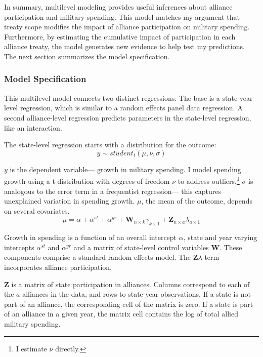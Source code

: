 \documentclass[12pt]{article}
\begin{document}
In summary, multilevel modeling provides useful inferences about alliance participation and military spending. 
This model matches my argument that treaty scope modifies the impact of alliance participation on military spending. 
Furthermore, by estimating the cumulative impact of participation in each alliance treaty, the model generates new evidence to help test my predictions. 
The next section summarizes the model specification. 
 


\subsubsection{Model Specification} 

This multilevel model connects two distinct regressions. 
The base is a state-year-level regression, which is similar to a random effects panel data regression.
A second alliance-level regression predicts parameters in the state-level regression, like an interaction. 


The state-level regression starts with a distribution for the outcome:
\begin{equation}
y \sim student_t(\mu, \nu, \sigma)
\end{equation}
 

$y$ is the dependent variable--- growth in military spending. 
I model spending growth using a t-distribution with degrees of freedom $\nu$ to address outliers.\footnote{I estimate $\nu$ directly.}
$\sigma$ is analogous to the error term in a frequentist regression--- this captures unexplained variation in spending growth.  
$\mu$, the mean of the outcome, depends on several covariates.
\begin{equation}
\mu = \alpha + \alpha^{st} + \alpha^{yr} +\textbf{W}_{n \times k} \gamma_{k \times 1}  + \textbf{Z}_{n \times a} \lambda_{a \times 1} 
\end{equation}


Growth in spending is a function of an overall intercept $\alpha$, state and year varying intercepts $\alpha^{st}$ and $\alpha^{yr}$ and a matrix of state-level control variables $\textbf{W}$.
These components comprise a standard random effects model. 
The $\textbf{Z} \lambda$ term incorporates alliance participation.


$\textbf{Z}$ is a matrix of state participation in alliances. 
Columns correspond to each of the $a$ alliances in the data, and rows to state-year observations. 
If a state is not part of an alliance, the corresponding cell of the matrix is zero.
If a state is part of an alliance in a given year, the matrix cell contains the log of total allied military spending.
\end{document}
